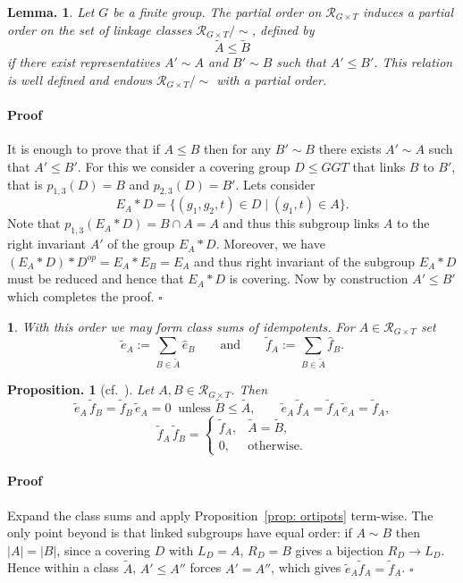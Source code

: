 \documentclass[12pt]{article}
\theoremstyle{change}
\newtheorem{lem}[theorem]{Lemma.}
\newtheorem{prop}[theorem]{Proposition.}
\newtheorem{nothing}[theorem]{}
\newenvironment{proof}{\paragraph{Proof}}{\hfill$\square$}
\renewcommand{\le}{\leqslant} %
\newcommand{\calR}{\mathcal{R}}
\newcommand{\1}{{\bf 1}}
\begin{document}
\begin{lem}
Let $G$ be a finite group. The partial order on $\calR_{G\times T}$ induces a partial order on the set of linkage classes $\calR_{G\times T}/\sim$, defined by
\[
\widetilde{A} \leq \widetilde{B}
\]
if there exist representatives $A' \sim A$ and $B' \sim B$ such that $A' \leq B'$. This relation is well defined and endows $\calR_{G\times T}/\sim$ with a partial order.
\end{lem}

\begin{proof}
    It is enough to prove that if $A\leq B$ then for any $B'\sim B$ there exists $A'\sim A$ such that $A'\leq B'$. For this we consider a covering group $D\leq GGT$ that links $B$ to $B'$, that is $p_{1,3}(D)=B$ and $p_{2,3}(D)=B'$. Lets consider
    \[
        E_A*D=\{(g_1,g_2,t)\in D\mid (g_1,t)\in A\}.
    \]
    Note that $p_{1,3}(E_A*D)=B\cap A=A$ and thus this subgroup links $A$ to the right invariant $A'$ of the group $E_A*D$. Moreover, we have $(E_A*D)*D^{op}=E_A*E_B=E_A$ and thus right invariant of the subgroup $E_A*D$ must be reduced and hence that $E_A*D$ is covering. Now by construction $A'\leq B'$ which completes the proof.
\end{proof}

\begin{nothing}
With this order we may form class sums of idempotents. For $A\in\calR_{G\times T}$ set
\[
\widetilde{e}_A:=\sum_{B\in\widetilde{A}}\widehat{e}_B
\qquad\text{and}\qquad
\widetilde{f}_A:=\sum_{B\in\widetilde{A}}\widehat{f}_B .
\]
\end{nothing}

\begin{prop}[cf.\ {\cite[Proposition 5.6]{BC}}]\label{prop: centipots}
Let $A,B\in\calR_{G\times T}$. Then
\[
\widetilde{e}_A\,\widetilde{f}_B=\widetilde{f}_B\,\widetilde{e}_A=0\ \text{ unless }\widetilde{B}\le\widetilde{A},
\qquad
\widetilde{e}_A\,\widetilde{f}_A=\widetilde{f}_A\,\widetilde{e}_A=\widetilde{f}_A,
\]
\[
\widetilde{f}_A\,\widetilde{f}_B=
\begin{cases}\widetilde{f}_A,&\widetilde{A}=\widetilde{B},\\[2pt]0,&\text{otherwise.}\end{cases}
\]
\end{prop}
\begin{proof}
Expand the class sums and apply Proposition~\ref{prop: ortipots} term-wise. The only point beyond \cite[Proposition 5.6]{BC} is that linked subgroups have equal order: if $A\sim B$ then $|A|=|B|$,
since a covering $D$ with $L_D=A$, $R_D=B$ gives a bijection $R_D\to L_D$. Hence within a class $\widetilde A$, $A'\le A''$ forces $A'=A''$, which gives $\widetilde e_A\widetilde f_A=\widetilde f_A$.
\end{proof}
\end{document}
